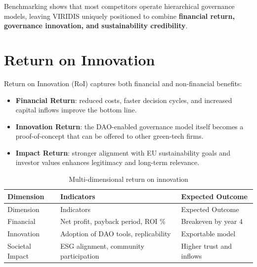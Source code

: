 \documentclass[
  english,
  12pt,
  oneside,
  open=any]{scrbook}
\providecommand{\tightlist}{%
  \setlength{\itemsep}{0pt}\setlength{\parskip}{0pt}}\usepackage{longtable,booktabs,array}
\begin{document}
Benchmarking shows that most competitors operate hierarchical governance
models, leaving VIRIDIS uniquely positioned to combine \textbf{financial
return, governance innovation, and sustainability credibility}.

\section{Return on Innovation}\label{sec-roi}

Return on Innovation (RoI) captures both financial and non-financial
benefits:

\begin{itemize}
\tightlist
\item
  \textbf{Financial Return}: reduced costs, faster decision cycles, and
  increased capital inflows improve the bottom line.\\
\item
  \textbf{Innovation Return}: the DAO-enabled governance model itself
  becomes a proof-of-concept that can be offered to other green-tech
  firms.\\
\item
  \textbf{Impact Return}: stronger alignment with EU sustainability
  goals and investor values enhances legitimacy and long-term relevance.
\end{itemize}

\begin{longtable}[]{@{}
  >{\raggedright\arraybackslash}p{}
  >{\raggedright\arraybackslash}p{}
  >{\raggedright\arraybackslash}p{}@{}}
\caption{Multi-dimensional return on
innovation}\label{tbl-roi}\tabularnewline
\toprule\noalign{}
\begin{minipage}[b]{\linewidth}\raggedright
Dimension
\end{minipage} & \begin{minipage}[b]{\linewidth}\raggedright
Indicators
\end{minipage} & \begin{minipage}[b]{\linewidth}\raggedright
Expected Outcome
\end{minipage} \\
\midrule\noalign{}
\endfirsthead
\toprule\noalign{}
\begin{minipage}[b]{\linewidth}\raggedright
Dimension
\end{minipage} & \begin{minipage}[b]{\linewidth}\raggedright
Indicators
\end{minipage} & \begin{minipage}[b]{\linewidth}\raggedright
Expected Outcome
\end{minipage} \\
\midrule\noalign{}
\endhead
\bottomrule\noalign{}
\endlastfoot
Financial & Net profit, payback period, ROI \% & Breakeven by year 4 \\
Innovation & Adoption of DAO tools, replicability & Exportable model \\
Societal Impact & ESG alignment, community participation & Higher trust
and inflows \\
\end{longtable}
\end{document}
